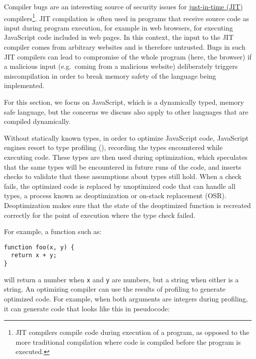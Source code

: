\documentclass[
  a4paper,
]{report}
\begin{document}
Compiler bugs are an interesting source of security issues for
\label{__index_entry_89}{\href{https://en.wikipedia.org/wiki/Just-in-time_compilation}{just-in-time
(JIT)} compilers}\footnote{JIT
  compilers compile code during execution of a program, as opposed to
  the more traditional compilation where code is compiled before the
  program is executed.}. JIT compilation is often used in programs that
receive source code as input during program execution, for example in
web browsers, for executing JavaScript code included in web pages. In
this context, the input to the JIT compiler comes from arbitrary
websites and is therefore untrusted. Bugs in such JIT compilers can lead
to compromise of the whole program (here, the browser) if a malicious
input (e.g.~coming from a malicious website) deliberately triggers
miscompilation in order to break memory safety of the language being
implemented.

For this section, we focus on JavaScript, which is a dynamically typed,
memory safe language, but the concerns we discuss also apply to other
languages that are compiled dynamically.

Without statically known types, in order to optimize JavaScript code,
JavaScript engines resort to type profiling
(), recording the types encountered
while executing code. These types are then used during optimization,
which speculates that the same types will be encountered in future runs
of the code, and inserts checks to validate that these assumptions about
types still hold. When a check fails, the optimized code is replaced by
unoptimized code that can handle all types, a process known as
\label{__index_entry_90}{deoptimization}
or \label{__index_entry_91}{on-stack replacement
(OSR)}. Deoptimization makes sure that
the state of the deoptimized function is recreated correctly for the
point of execution where the type check failed.

For example, a function such as:

\begin{verbatim}
function foo(x, y) {
  return x + y;
}
\end{verbatim}

will return a number when \texttt{x} and \texttt{y} are numbers, but a
string when either is a string. An optimizing compiler can use the
results of profiling to generate optimized code. For example, when both
arguments are integers during profiling, it can generate code that looks
like this in pseudocode:
\end{document}
